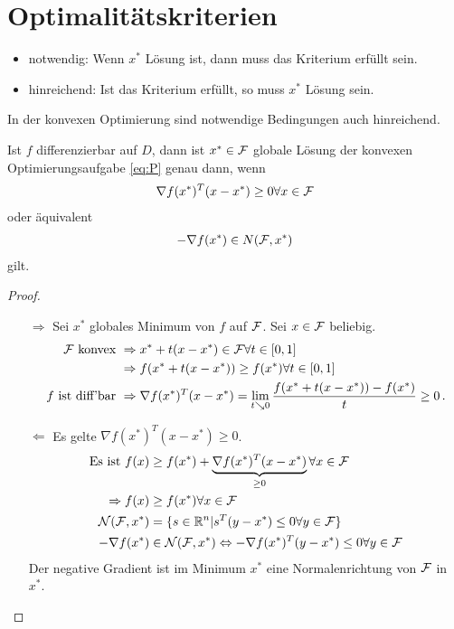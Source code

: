 \section*{Optimalitätskriterien}
\begin{itemize}
\item notwendig: Wenn $x^*$ Lösung ist, dann muss das Kriterium erfüllt sein.
\item hinreichend: Ist das Kriterium erfüllt, so muss $x^*$ Lösung sein.
\end{itemize}
In der konvexen Optimierung sind notwendige Bedingungen auch hinreichend.
\begin{Satz}
\label{opt1}
Ist $f$ differenzierbar auf $D$, dann ist $x^* \in \mathcal{F}$ globale Lösung der konvexen Optimierungsaufgabe \eqref{eq:P} genau dann, wenn
\begin{align*}
\nabla f(x^*)^T(x - x^*) \geq 0  \forall x \in \mathcal{F}
\end{align*}
oder äquivalent
\begin{align*}
-\nabla f(x^*) \in N(\mathcal{F}, x^*)
\end{align*}
gilt.
\end{Satz}
\begin{proof}
\begin{itemize}
\item[$\Rightarrow$] Sei $x^*$ globales Minimum von $f$ auf $\mathcal{F}$. Sei $x\in \mathcal{F}$ beliebig.
\begin{align*}
\mathcal{F} \text{ konvex } &\Rightarrow x^*+t(x-x^*) \in \mathcal{F} \forall t \in [0,1]\\
&\Rightarrow f(x^*+t(x-x^*)) \geq f(x^*) \forall t \in [0,1] \\
f \text{ ist diff'bar } &\Rightarrow \nabla f(x^*)^T(x-x^*)=\lim_{t\searrow 0}\frac{f(x^*+t(x-x^*))-f(x^*)}{t} \geq 0\,.
\end{align*}
\item[$\Leftarrow$] Es gelte $\nabla f(x^*)^T(x - x^*) \geq 0$.
\begin{align*}
\text{Es ist } f(x) &\geq f(x^*)+\underbrace{\nabla f(x^*)^T(x-x^*)}_{\geq 0} \forall x \in \mathcal{F} \\
\Rightarrow f(x) &\geq f(x^*)  \forall x\in \mathcal{F} \\
\mathcal{N}(\mathcal{F}, x^*)&=\lbrace s\in\mathbb R^n | s^T(y-x^*)\leq 0 \forall y\in\mathcal{F} \rbrace \\
-\nabla f(x^*)&\in\mathcal{N}(\mathcal{F},x^*)\Leftrightarrow -\nabla f(x^*)^T(y-x^*)\leq 0 \forall y\in\mathcal{F}
\end{align*}
Der negative Gradient ist im Minimum $x^*$ eine Normalenrichtung von $\mathcal{F}$ in $x^*$.
\end{itemize}
\end{proof}

